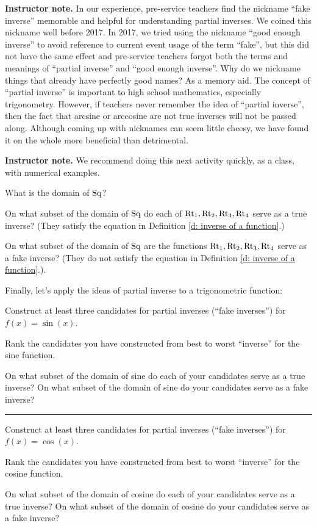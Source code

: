 \documentclass[11pt]{article}
\newcommand\smallnote[1]
	{\begin{mdframed}\raggedright  {\bf Instructor note.} {#1} \end{mdframed}}
\newenvironment{task}
	{\begin{mdframed}[linecolor=lightgray, linewidth=3pt]\raggedright}
	{\end{mdframed}}
\newcommand\tn{\textnormal}
\theoremstyle{definition}
\begin{document}
\smallnote{In our experience, pre-service teachers find the nickname ``fake inverse'' memorable and helpful for understanding partial inverses. We coined this nickname well before 2017. In 2017, we tried using the nickname ``good enough inverse'' to avoid reference to current event usage of the term ``fake'', but this did not have the same effect and pre-service teachers forgot both the terms and meanings of ``partial inverse'' and ``good enough inverse''.  Why do we nickname things that already have perfectly good names? As a memory aid. The concept of ``partial inverse'' is important to high school mathematics, especially trigonometry. However, if teachers never remember the idea of ``partial inverse'', then the fact that arcsine or arccosine are not true inverses will not be passed along. Although coming up with nicknames can seem little cheesy, we have found it on the whole more beneficial than detrimental.}

\smallnote{We recommend doing this next activity quickly, as a class, with numerical examples.}
\begin{task}
What is the domain of $\tn{Sq}$? 

On what subset of the domain of $\tn{Sq}$ do each of  $\tn{Rt}_1, \tn{Rt}_2, \tn{Rt}_3, \tn{Rt}_4$ serve as a true inverse?  (They satisfy the equation in Definition \ref{d: inverse of a function}.)

On what subset of the domain of $\tn{Sq}$ are the functions $\tn{Rt}_1, \tn{Rt}_2, \tn{Rt}_3, \tn{Rt}_4$ serve as a fake inverse? (They do not satisfy the equation in Definition \ref{d: inverse of a function}.). 
\end{task}

Finally, let's apply the ideas of partial inverse to a trigonometric function:
 
\begin{task}
Construct at least three candidates for partial inverses (``fake inverses'') for $f(x)=\sin(x)$. 

Rank the candidates you have constructed from best to worst ``inverse'' for the sine function.

On what subset of the domain of sine do each of your candidates serve as a true inverse? On what subset of the domain of sine do your candidates serve as a fake inverse? 

\vspace*{2pt} \hrule \vspace*{2pt}
Construct at least three candidates for partial inverses (``fake inverses'') for $f(x)=\cos(x)$. 

Rank the candidates you have constructed from best to worst ``inverse'' for the cosine function.

On what subset of the domain of cosine do each of your candidates serve as a true inverse? On what subset of the domain of cosine do your candidates serve as a fake inverse? 
\end{task}
\end{document}
